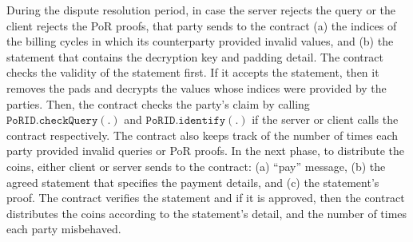 During the dispute resolution period, in case the server rejects the query or the client rejects the PoR proofs, that party sends to the contract (a) the indices of the billing cycles in which its counterparty provided invalid values, and (b)  the statement that contains the decryption key and padding detail. The contract checks the validity of the statement first. If it accepts the statement, then it removes the pads and decrypts the values whose indices were provided by the parties. Then, the contract checks the party’s claim by calling $\mathtt{PoRID.checkQuery (.)}$ and $\mathtt{PoRID.identify (.)}$ if the server or client calls the contract respectively. The contract also keeps track of the number of times each party provided invalid queries or PoR proofs.  
In the next phase, to distribute the coins, either client or server sends to the contract: (a) “pay” message, (b) the agreed statement that specifies the payment details, and (c) the statement’s proof. The contract verifies the statement and if it is approved, then the contract distributes the coins according to the statement’s detail, and the number of times each party misbehaved. 



